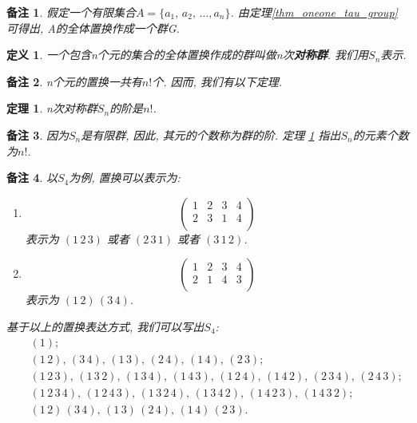 \documentclass[utf8]{ctexbook}
\newtheorem{theorem}{定理}[section]
\newtheorem{definition}{定义}[section]
\newtheorem{memo}{备注}[section]
\begin{document}
\begin{memo}
假定一个有限集合$A = \{a_1, \, a_2, \, \ldots, a_n \}$. 由定理\ref{thm_oneone_tau_group} 可得出, A的全体置换作成一个群G. 
\end{memo}

\begin{definition}
一个包含n个元的集合的全体置换作成的群叫做n次\textbf{对称群}. 我们用$S_n$表示.
\end{definition}

\begin{memo}
n个元的置换一共有$n!$个. 因而, 我们有以下定理.
\end{memo}

\begin{theorem}\label{thm_Sn_rank}
n次对称群$S_n$的阶是$n!$.
\end{theorem}

\begin{memo}
因为$S_n$是有限群, 因此, 其元的个数称为群的阶. 定理 \ref{thm_Sn_rank} 指出$S_n$的元素个数为$n!$.
\end{memo}

\begin{memo}
以$S_4$为例, 置换可以表示为:
\begin{enumerate}
\item{
\begin{equation}\nonumber
\left(
\begin{array}{cccc}
1 & 2 & 3 & 4\\
2 & 3 & 1 & 4\\
\end{array}
\right)
\end{equation}
表示为 $(1\, 2\, 3)$ 或者 $(2 \, 3 \, 1)$ 或者 $(3 \, 1\, 2)$.
}
\item{
\begin{equation}\nonumber
\left(
\begin{array}{cccc}
1 & 2 & 3 & 4\\
2 & 1 & 4 & 3\\
\end{array}
\right)
\end{equation}
表示为 $(1\, 2)\, (3 \, 4)$.
}
\end{enumerate}
基于以上的置换表达方式, 我们可以写出$S_4$:
\begin{eqnarray*}
& & (1); \\
& & (1\, 2), \, (3\, 4), \, (1\, 3), \, (2\, 4), \, (1\, 4), \, (2\, 3); \\
& & (1 \, 2 \, 3), \, (1\, 3\, 2), \, (1 \, 3 \, 4), \, (1 \, 4 \, 3), \, (1 \, 2 \, 4), \, (1 \, 4 \, 2), \, (2 \, 3 \, 4), \, (2 \, 4 \, 3); \\ 
& & (1 \, 2 \, 3 \, 4), \, (1 \, 2 \, 4 \, 3), \, (1 \, 3 \, 2 \, 4), \, (1 \, 3 \, 4 \, 2), \, (1 \, 4 \, 2 \, 3), \, (1 \, 4 \, 3 \, 2); \\
& & (1 \, 2) \, (3 \, 4), \, (1 \, 3) \, (2 \, 4), \, (1 \, 4) \, (2 \, 3).
\end{eqnarray*}
\end{memo}
\end{document}
